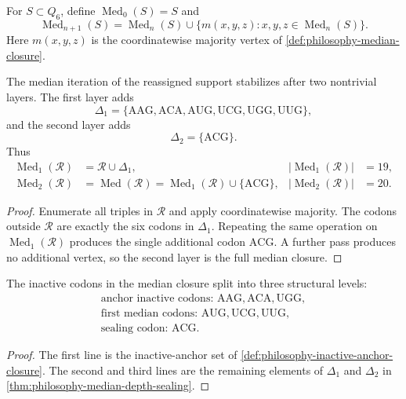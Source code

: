 \begin{definition}
\label{def:philosophy-median-iteration-layers}
For $S\subset Q_{6}$, define $\operatorname{Med}_{0}(S)=S$ and
$$
  \operatorname{Med}_{n+1}(S)
  =
  \operatorname{Med}_{n}(S)
  \cup
  \{m(x,y,z):x,y,z\in \operatorname{Med}_{n}(S)\}.
$$
Here $m(x,y,z)$ is the coordinatewise majority vertex of
\autoref{def:philosophy-median-closure}.
\end{definition}

\begin{theorem}
\label{thm:philosophy-median-depth-sealing}
The median iteration of the reassigned support stabilizes after two
nontrivial layers. The first layer adds
$$
  \Delta_{1}
  =
  \{\mathrm{AAG},\mathrm{ACA},\mathrm{AUG},
    \mathrm{UCG},\mathrm{UGG},\mathrm{UUG}\},
$$
and the second layer adds
$$
  \Delta_{2}=\{\mathrm{ACG}\}.
$$
Thus
$$
\begin{aligned}
  \operatorname{Med}_{1}(\mathcal{R})
  &=
  \mathcal{R}\cup\Delta_{1},
  &
  |\operatorname{Med}_{1}(\mathcal{R})|
  &=19,\\
  \operatorname{Med}_{2}(\mathcal{R})
  &=
  \operatorname{Med}(\mathcal{R})
  =
  \operatorname{Med}_{1}(\mathcal{R})\cup\{\mathrm{ACG}\},
  &
  |\operatorname{Med}_{2}(\mathcal{R})|
  &=20.
\end{aligned}
$$
\end{theorem}
\begin{proof}
Enumerate all triples in $\mathcal{R}$ and apply coordinatewise
majority. The codons outside $\mathcal{R}$ are exactly the six codons in $\Delta_{1}$.
Repeating the same operation on $\operatorname{Med}_{1}(\mathcal{R})$
produces the single additional codon $\mathrm{ACG}$. A further pass
produces no additional vertex, so the second layer is the full median
closure.
\end{proof}

\begin{corollary}
\label{cor:philosophy-inactive-median-levels}
The inactive codons in the median closure split into three structural
levels:
$$
\begin{gathered}
  \text{anchor inactive codons: }
  \mathrm{AAG},\mathrm{ACA},\mathrm{UGG},\\
  \text{first median codons: }
  \mathrm{AUG},\mathrm{UCG},\mathrm{UUG},\\
  \text{sealing codon: }
  \mathrm{ACG}.
\end{gathered}
$$
\end{corollary}
\begin{proof}
The first line is the inactive-anchor set of
\autoref{def:philosophy-inactive-anchor-closure}. The second and third
lines are the remaining elements of $\Delta_{1}$ and $\Delta_{2}$ in
\autoref{thm:philosophy-median-depth-sealing}.
\end{proof}

